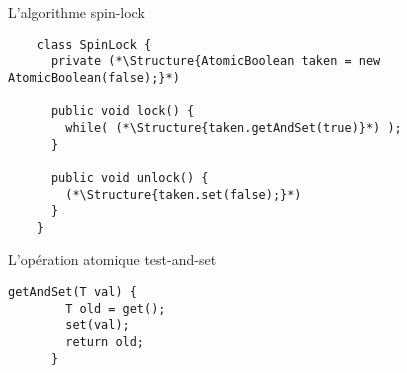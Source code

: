 
\begingroup

\begin{frame}[fragile]{L'algorithme spin-lock}

  \begin{lstlisting}
    class SpinLock {
      private (*\Structure{AtomicBoolean taken = new AtomicBoolean(false);}*)

      public void lock() {
        while( (*\Structure{taken.getAndSet(true)}*) );
      }

      public void unlock() {
        (*\Structure{taken.set(false);}*)
      }
    }
  \end{lstlisting}

  \begin{block}{L'opération \alert{atomique} test-and-set}
    \begin{lstlisting}[gobble=4]
      getAndSet(T val) {
        T old = get();
        set(val);
        return old;
      }
    \end{lstlisting}
  \end{block}



\end{frame}

\endgroup
\endinput
